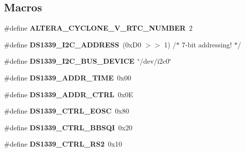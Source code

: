 \subsection*{Macros}
\begin{DoxyCompactItemize}
\item 
\mbox{\label{arm_2altera-cyclone-v_2rtc_2rtc_8c_a931161e479bd6482a59a1457700a0d03}} 
\#define {\bfseries A\+L\+T\+E\+R\+A\+\_\+\+C\+Y\+C\+L\+O\+N\+E\+\_\+\+V\+\_\+\+R\+T\+C\+\_\+\+N\+U\+M\+B\+ER}~2
\item 
\mbox{\label{arm_2altera-cyclone-v_2rtc_2rtc_8c_ab18ff61c373e51f7310df5c7705c37b4}} 
\#define {\bfseries D\+S1339\+\_\+\+I2\+C\+\_\+\+A\+D\+D\+R\+E\+SS}~(0x\+D0 $>$$>$ 1)  /$\ast$ 7-\/bit addressing! $\ast$/
\item 
\mbox{\label{arm_2altera-cyclone-v_2rtc_2rtc_8c_ab72b803ea5e582784bcbd4b18c8db807}} 
\#define {\bfseries D\+S1339\+\_\+\+I2\+C\+\_\+\+B\+U\+S\+\_\+\+D\+E\+V\+I\+CE}~\char`\"{}/dev/i2c0\char`\"{}
\item 
\mbox{\label{arm_2altera-cyclone-v_2rtc_2rtc_8c_a7c12d4af639bd2e5f5f50ae3d5fcaca7}} 
\#define {\bfseries D\+S1339\+\_\+\+A\+D\+D\+R\+\_\+\+T\+I\+ME}~0x00
\item 
\mbox{\label{arm_2altera-cyclone-v_2rtc_2rtc_8c_ae7e39bedf440aa44d298c6fc975e3e2a}} 
\#define {\bfseries D\+S1339\+\_\+\+A\+D\+D\+R\+\_\+\+C\+T\+RL}~0x0E
\item 
\mbox{\label{arm_2altera-cyclone-v_2rtc_2rtc_8c_a00d2b832af35bcb5cfc1d689d5a5fae9}} 
\#define {\bfseries D\+S1339\+\_\+\+C\+T\+R\+L\+\_\+\+E\+O\+SC}~0x80
\item 
\mbox{\label{arm_2altera-cyclone-v_2rtc_2rtc_8c_ab727ed75cb39e703785b9b875d6cf3ea}} 
\#define {\bfseries D\+S1339\+\_\+\+C\+T\+R\+L\+\_\+\+B\+B\+S\+QI}~0x20
\item 
\mbox{\label{arm_2altera-cyclone-v_2rtc_2rtc_8c_ac72e73467bb1ba9120eec51a916b730d}} 
\#define {\bfseries D\+S1339\+\_\+\+C\+T\+R\+L\+\_\+\+R\+S2}~0x10
$$
\end{DoxyCompactItemize}
